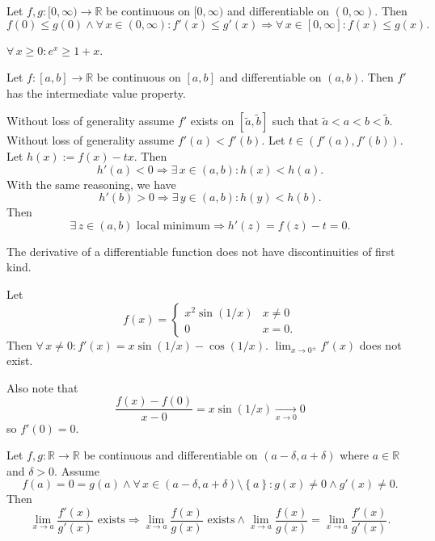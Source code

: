 \documentclass{notes}
\begin{document}
  \begin{cor}
    Let $f, g: [0, \infty) \to \mathbb R$ be continuous on $[0, \infty)$ and differentiable on $(0, \infty)$.
    Then 
    \[
      f(0) \leq g(0) \land \forall \, x \in (0, \infty): f'(x) \leq g'(x) \Rightarrow \forall \, x \in [0, \infty]: f(x) \leq g(x).
    \]
  \end{cor}
  
  \begin{eg}
    $\forall \, x \geq 0: e^x \geq 1 + x$.
  \end{eg}
  
  \begin{lem}
    Let $f \colon [a, b] \to \mathbb R$ be continuous on $[a, b]$ and differentiable on $(a, b)$.
    Then $f'$ has the intermediate value property.
  \end{lem}
  
  \newpage
  
  \begin{prf}
    Without loss of generality assume $f'$ exists on $[\tilde a, \tilde b]$ such that $\tilde a < a < b < \tilde b$.
    Without loss of generality assume $f'(a) < f'(b)$.
    Let $t \in (f'(a), f'(b))$.
    Let $h(x) := f(x) - t x$.
    Then 
    \[
      h'(a) < 0 \Rightarrow \exists \, x \in (a, b): h(x) < h(a).
    \]
    With the same reasoning, we have 
    \[
      h'(b) > 0 \Rightarrow \exists \, y \in (a, b): h(y) < h(b).
    \]
    Then 
    \[
      \exists \, z \in (a, b) \text{ local minimum} \Rightarrow h'(z) = f(z) - t = 0.
    \]
  \end{prf}
  
  \begin{cor}
    The derivative of a differentiable function does not have discontinuities of first kind.
  \end{cor}
  
  \begin{eg}
    Let 
    \[
      f(x) = \begin{cases}
        x^2 \sin(1 / x) & x \neq 0 \\ 
        0 & x = 0.
      \end{cases}
    \]
    Then $\forall \, x \neq 0: f'(x) = x \sin(1 / x) - \cos(1 / x)$.
    $\lim_{x \to 0^\pm} f'(x)$ does not exist.

    Also note that 
    \[
      \frac{f(x) - f(0)}{x - 0} = x \sin(1 / x) \underset{x \to 0}{\longrightarrow} 0
    \]
    so $f'(0) = 0$.
  \end{eg}
  
  \begin{thm}
    Let $f, g \colon \mathbb R \to \mathbb R$ be continuous and differentiable on $(a - \delta, a + \delta)$ where $a \in \mathbb R$ and $\delta > 0$.
    Assume 
    \[
      f(a) = 0 = g(a) \land \forall \, x \in (a - \delta, a + \delta) \setminus \left \{ a \right \}: g(x) \neq 0 \land g'(x) \neq 0.
    \]
    Then 
    \[
      \lim_{x \to a} \frac{f'(x)}{g'(x)} \text{ exists} \Rightarrow \lim_{x \to a} \frac{f(x)}{g(x)} \text{ exists} \land \lim_{x \to a} \frac{f(x)}{g(x)} = \lim_{x \to a} \frac{f'(x)}{g'(x)}.
    \]
  \end{thm}
  
\end{document}
